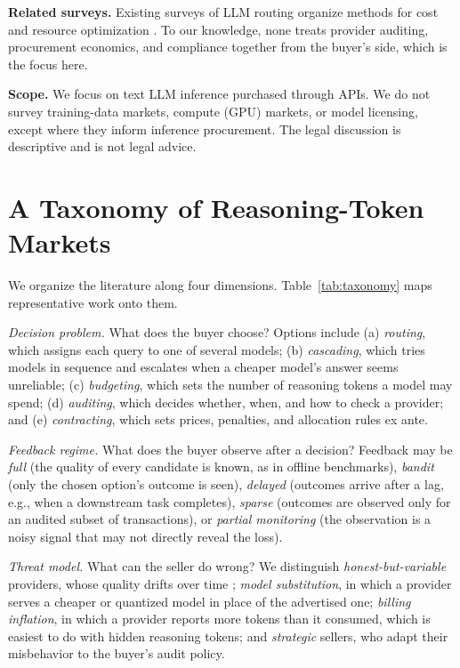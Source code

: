 \documentclass[sigconf]{acmart}
\begin{document}
\textbf{Related surveys.} Existing surveys of LLM routing organize methods for cost and resource optimization \cite{varangot2025routingsurvey}. To our knowledge, none treats provider auditing, procurement economics, and compliance together from the buyer's side, which is the focus here.

\textbf{Scope.} We focus on text LLM inference purchased through APIs. We do not survey training-data markets, compute (GPU) markets, or model licensing, except where they inform inference procurement. The legal discussion is descriptive and is not legal advice.

\section{A Taxonomy of Reasoning-Token Markets}\label{a-taxonomy-of-reasoning-token-markets}

We organize the literature along four dimensions. Table~\ref{tab:taxonomy} maps representative work onto them.

\emph{Decision problem.} What does the buyer choose? Options include (a) \emph{routing}, which assigns each query to one of several models; (b) \emph{cascading}, which tries models in sequence and escalates when a cheaper model's answer seems unreliable; (c) \emph{budgeting}, which sets the number of reasoning tokens a model may spend; (d) \emph{auditing}, which decides whether, when, and how to check a provider; and (e) \emph{contracting}, which sets prices, penalties, and allocation rules ex ante.

\emph{Feedback regime.} What does the buyer observe after a decision? Feedback may be \emph{full} (the quality of every candidate is known, as in offline benchmarks), \emph{bandit} (only the chosen option's outcome is seen), \emph{delayed} (outcomes arrive after a lag, e.g., when a downstream task completes), \emph{sparse} (outcomes are observed only for an audited subset of transactions), or \emph{partial monitoring} (the observation is a noisy signal that may not directly reveal the loss).

\emph{Threat model.} What can the seller do wrong? We distinguish \emph{honest-but-variable} providers, whose quality drifts over time \cite{chen2024drift}; \emph{model substitution}, in which a provider serves a cheaper or quantized model in place of the advertised one; \emph{billing inflation}, in which a provider reports more tokens than it consumed, which is easiest to do with hidden reasoning tokens; and \emph{strategic} sellers, who adapt their misbehavior to the buyer's audit policy.
\end{document}
